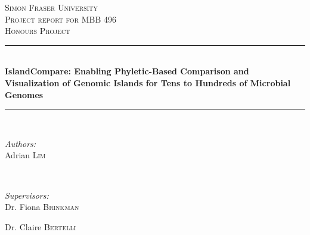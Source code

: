 	\begin{titlepage}

		\newcommand{\HRule}{\rule{\linewidth}{0.5mm}} %

		\center %


		\textsc{\LARGE Simon Fraser University}\\[1.5cm] %
		\textsc{\Large Project report for MBB 496}\\[0.5cm] %
		\textsc{\large Honours Project}\\[0.5cm] %


		\HRule \\[0.4cm]
		{ \bfseries IslandCompare: Enabling Phyletic-Based Comparison and Visualization of Genomic Islands for Tens to Hundreds of Microbial Genomes}\\[0.4cm] %
		\HRule \\[1.5cm]


		\begin{minipage}{0.4\textwidth}
			\begin{flushleft} \large
				\emph{Authors:}\\
				Adrian \textsc{Lim} \\
			\end{flushleft}
		\end{minipage}
		~
		\begin{minipage}{0.4\textwidth}
			\begin{flushright} \large
				\emph{Supervisors:} \\
				Dr. Fiona \textsc{Brinkman} %

				Dr. Claire \textsc{Bertelli} %
			\end{flushright}
		\end{minipage}\\[2cm]


\end{titlepage}
